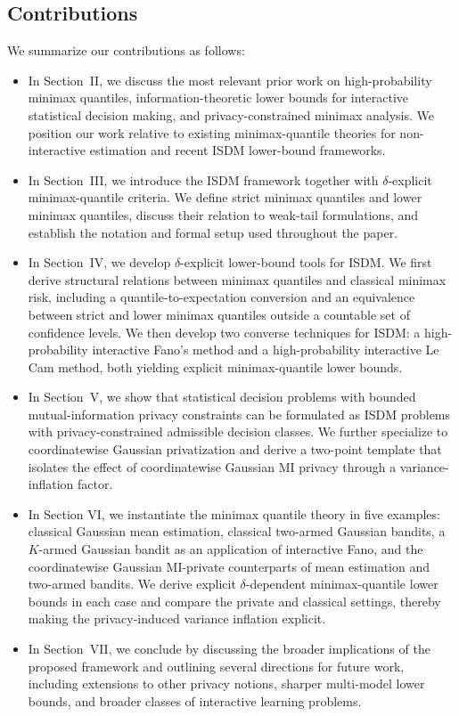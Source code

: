 \documentclass[journal]{IEEEtran}
\begin{document}
\subsection{Contributions}
 We summarize our contributions as follows:
\begin{itemize}
    \item  In Section~II, we discuss the most relevant prior work on high-probability minimax quantiles, information-theoretic lower bounds for interactive statistical decision making, and privacy-constrained minimax analysis. We position our work relative to existing minimax-quantile theories for non-interactive estimation and recent ISDM lower-bound frameworks.
    \item In Section~III, we introduce the ISDM framework together with \(\delta\)-explicit minimax-quantile criteria. We define strict minimax quantiles and lower minimax quantiles, discuss their relation to weak-tail formulations, and establish the notation and formal setup used throughout the paper.
    \item In Section~IV, we develop \(\delta\)-explicit lower-bound tools for ISDM. We first derive structural relations between minimax quantiles and classical minimax risk, including a quantile-to-expectation conversion and an equivalence between strict and lower minimax quantiles outside a countable set of confidence levels. We then develop two converse techniques for ISDM: a high-probability interactive Fano's method and a high-probability interactive Le Cam method, both yielding explicit minimax-quantile lower bounds.
    \item In Section~V, we show that statistical decision problems with bounded mutual-information privacy constraints can be formulated as ISDM problems with privacy-constrained admissible decision classes. We further specialize to coordinatewise Gaussian privatization and derive a two-point template that isolates the effect of coordinatewise Gaussian MI privacy through a variance-inflation factor.
    \item In Section VI, we instantiate the minimax quantile theory in five examples:
classical Gaussian mean estimation, classical two-armed Gaussian bandits, a
\(K\)-armed Gaussian bandit as an application of interactive Fano, and the
coordinatewise Gaussian MI-private counterparts of mean estimation and
two-armed bandits. We derive explicit \(\delta\)-dependent minimax-quantile lower bounds in each case and compare the private and classical settings, thereby making the privacy-induced variance inflation explicit.
    \item In Section~VII, we conclude by discussing the broader implications of the proposed framework and outlining several directions for future work, including extensions to other privacy notions, sharper multi-model lower bounds, and broader classes of interactive learning problems.
\end{itemize}
\end{document}
